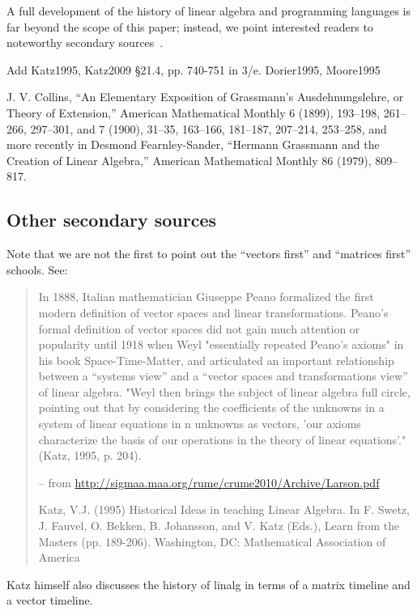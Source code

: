 A full development of the history of linear algebra and programming languages is
far beyond the scope of this paper; instead, we point interested readers to
noteworthy secondary sources~\cite{Parshall1985,Kleiner2007,Higham2009}.

Add Katz1995, Katz2009 \S 21.4, pp. 740-751 in 3/e.
Dorier1995, Moore1995

J. V. Collins, “An Elementary
Exposition of Grassmann’s Ausdehnungslehre, or Theory
of Extension,” American Mathematical Monthly 6
(1899), 193–198, 261–266, 297–301, and 7 (1900), 31–35,
163–166, 181–187, 207–214, 253–258, and more recently
in Desmond Fearnley-Sander, “Hermann Grassmann and
the Creation of Linear Algebra,” American Mathematical
Monthly 86 (1979), 809–817.

\subsection{Other secondary sources}


Note that we are not the first to point out the ``vectors first'' and ``matrices first'' schools.
See:

\begin{quote}
In 1888, Italian mathematician Giuseppe Peano formalized the first modern definition of
vector spaces and linear transformations. Peano's formal definition of vector spaces did not gain
much attention or popularity until 1918 when Weyl "essentially repeated Peano's axioms" in his
book Space-Time-Matter, and articulated an important relationship between a “systems view”
and a “vector spaces and transformations view” of linear algebra. "Weyl then brings the subject
of linear algebra full circle, pointing out that by considering the coefficients of the unknowns in a
system of linear equations in n unknowns as vectors, 'our axioms characterize the basis of our
operations in the theory of linear equations'." (Katz, 1995, p. 204).

-- from \url{http://sigmaa.maa.org/rume/crume2010/Archive/Larson.pdf}

Katz, V.J. (1995) Historical Ideas in teaching Linear Algebra. In F. Swetz, J. Fauvel, O. Bekken,
B. Johansson, and V. Katz (Eds.), Learn from the Masters (pp. 189-206). Washington,
DC: Mathematical Association of America
\end{quote}

Katz himself also discusses the history of linalg in terms of a matrix timeline and a vector timeline.


